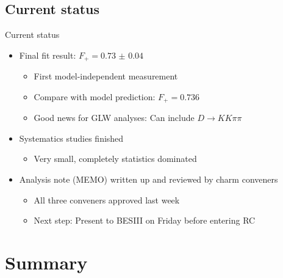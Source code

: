 \documentclass{beamer}
\begin{document}
\subsection{Current status}

\begin{frame}{Current status}
  \begin{itemize}
    \setlength\itemsep{1.5em}
    \item{Final fit result: $F_+ = \SI{0.73(4)}{}$}
    \begin{itemize}
      \item{First model-independent measurement}
      \item{Compare with model prediction: $F_+ = 0.736$}
      \item{Good news for GLW analyses: Can include $D\to KK\pi\pi$}
    \end{itemize}
    \item{Systematics studies finished}
    \begin{itemize}
      \item{Very small, completely statistics dominated}
    \end{itemize}
    \item{Analysis note (MEMO) written up and reviewed by charm conveners}
    \begin{itemize}
      \item{All three conveners approved last week}
      \item{Next step: Present to BESIII on Friday before entering RC}
    \end{itemize}
  \end{itemize}
\end{frame}
        

\section{Summary}
\end{document}
